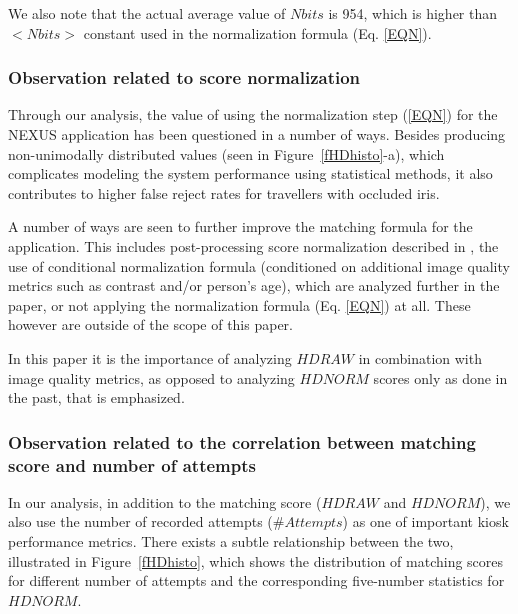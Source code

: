 \documentclass{cta-author}%
\begin{document}
We also note that the actual average value of $Nbits$ is 954, which is higher than $<Nbits>$ constant used in the normalization formula (Eq. \ref{EQN}).


\subsubsection{Observation related to score normalization }
\label{s.score.normalization}

Through our analysis, the value of using the normalization step (\ref{EQN}) for the NEXUS application has been questioned in a number of ways. Besides producing non-unimodally distributed values (seen in Figure~\ref{fHDhisto}-a), which complicates modeling the system performance using statistical methods, it also contributes to higher false reject rates for travellers with  occluded iris.

A number of ways are seen to further improve the matching formula for the application. This includes post-processing score normalization described in \cite{GorodnichyScore},  the use of conditional normalization formula (conditioned on additional image quality metrics such as contrast and/or person's age), which are analyzed further in the paper, or not applying the normalization formula (Eq. \ref{EQN}) at all. These however are outside of the scope of this paper. 

In this paper  it is the importance of analyzing $HDRAW$ in combination with image quality metrics, as opposed to analyzing  $HDNORM$ scores only as done in the past, that is emphasized. 


\subsubsection{Observation related to the correlation between matching score and number of attempts }
\label{s.HDvsAttm}


In our analysis, in addition to the matching score ($HDRAW$ and $HDNORM$), we also use the number of recorded attempts ($\# Attempts$) as one of  important kiosk performance metrics. 
There exists a subtle relationship between the two,  illustrated in Figure~\ref{fHDhisto}, which  
shows the distribution of matching scores for different number of attempts and the corresponding five-number statistics for $HDNORM$.%
\end{document}
